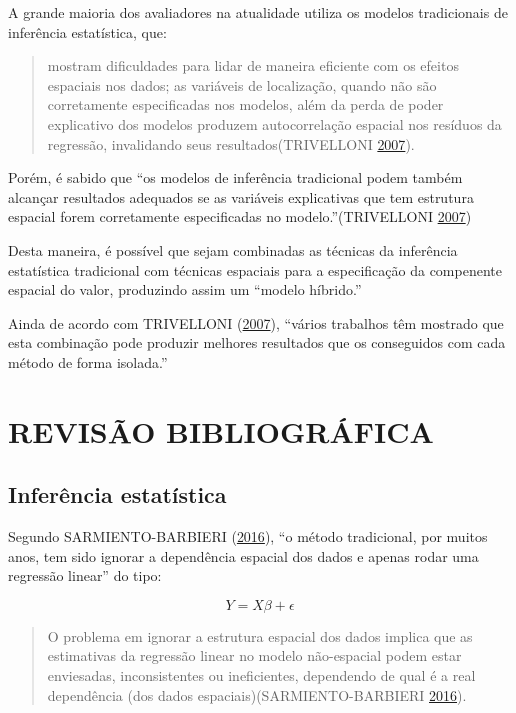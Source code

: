 \documentclass[12pt,]{article}
\begin{document}
A grande maioria dos avaliadores na atualidade utiliza os modelos
tradicionais de inferência estatística, que:

\begin{quote}
mostram dificuldades para lidar de maneira eficiente com os efeitos
espaciais nos dados; as variáveis de localização, quando não são
corretamente especificadas nos modelos, além da perda de poder
explicativo dos modelos produzem autocorrelação espacial nos resíduos da
regressão, invalidando seus resultados(TRIVELLONI
\protect\hyperlink{ref-trivelloni07}{2007}).
\end{quote}

Porém, é sabido que ``os modelos de inferência tradicional podem também
alcançar resultados adequados se as variáveis explicativas que tem
estrutura espacial forem corretamente especificadas no
modelo.''(TRIVELLONI \protect\hyperlink{ref-trivelloni07}{2007})

Desta maneira, é possível que sejam combinadas as técnicas da inferência
estatística tradicional com técnicas espaciais para a especificação da
compenente espacial do valor, produzindo assim um ``modelo híbrido.''

Ainda de acordo com TRIVELLONI
(\protect\hyperlink{ref-trivelloni07}{2007}), ``vários trabalhos têm
mostrado que esta combinação pode produzir melhores resultados que os
conseguidos com cada método de forma isolada.''

\section{REVISÃO BIBLIOGRÁFICA}\label{revisao-bibliografica}

\subsection{Inferência estatística}\label{inferencia-estatistica}

Segundo SARMIENTO-BARBIERI
(\protect\hyperlink{ref-sarmiento-barbieri}{2016}), ``o método
tradicional, por muitos anos, tem sido ignorar a dependência espacial
dos dados e apenas rodar uma regressão linear'' do tipo:

\begin{equation}
  \label{eq-OLS}
  Y = X\beta + \epsilon
\end{equation}

\begin{quote}
O problema em ignorar a estrutura espacial dos dados implica que as
estimativas da regressão linear no modelo não-espacial podem estar
enviesadas, inconsistentes ou ineficientes, dependendo de qual é a real
dependência (dos dados espaciais)(SARMIENTO-BARBIERI
\protect\hyperlink{ref-sarmiento-barbieri}{2016}).
\end{quote}
\end{document}
